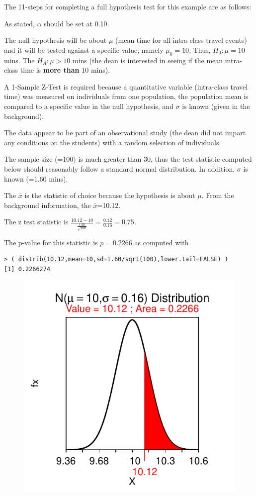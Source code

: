 \documentclass[10pt,openany]{book}\usepackage[]{graphicx}\usepackage[]{color}
\makeatletter
\newenvironment{kframe}{%
 \def\at@end@of@kframe{}%
 \ifinner\ifhmode%
  \def\at@end@of@kframe{\end{minipage}}%
  \begin{minipage}{\columnwidth}%
 \fi\fi%
 \def\FrameCommand##1{\hskip\@totalleftmargin \hskip-\fboxsep
 \colorbox{shadecolor}{##1}\hskip-\fboxsep
     \hskip-\linewidth \hskip-\@totalleftmargin \hskip\columnwidth}%
 \MakeFramed {\advance\hsize-\width
   \@totalleftmargin\z@ \linewidth\hsize
   \@setminipage}}%
 {\par\unskip\endMakeFramed%
 \at@end@of@kframe}
\newenvironment{knitrout}{}{} %
\makeatother
\begin{document}
The 11-steps  for completing a full hypothesis test for this example are as follows:
\begin{Enumerate}
  \item As stated, $\alpha$ should be set at 0.10.
  \item The null hypothesis will be about $\mu$ (mean time for all intra-class travel events) and it will be tested against a specific value, namely $\mu_{0}=10$.  Thus, $H_{0}:\mu=10$ mins.  The $H_{A}:\mu>10$ mins (the dean is interested in seeing if the mean intra-class time is \textbf{more than} 10 mins).
  \item A 1-Sample Z-Test is required because a quantitative variable (intra-class travel time) was measured on individuals from one population, the population mean is compared to a specific value in the null hypothesis, and $\sigma$ is known (given in the background).
  \item The data appear to be part of an observational study (the dean did not impart any conditions on the students) with a random selection of individuals.
  \item The sample size (=100) is much greater than 30, thus the test statistic computed below should reasonably follow a standard normal distribution.  In addition, $\sigma$ is known (=1.60 mins).
  \item The $\bar{x}$ is the statistic of choice because the hypothesis is about $\mu$.  From the background information, the $\bar{x}$=10.12.
  \item The z test statistic is $\frac{10.12-10}{\frac{1.60}{\sqrt{100}}} = \frac{0.12}{0.16} = 0.75$.
  \item The p-value for this statistic is $p=0.2266$  as computed with
\begin{knitrout}
\color{fgcolor}\begin{kframe}
\begin{verbatim}
> ( distrib(10.12,mean=10,sd=1.60/sqrt(100),lower.tail=FALSE) )
[1] 0.2266274
\end{verbatim}
\end{kframe}\begin{figure}[!h]

{\centering \includegraphics[width=.3\linewidth]{Figs/Ex1Zpvalue-1} 

}
\end{figure}
\end{knitrout}
\end{Enumerate}
\end{document}
